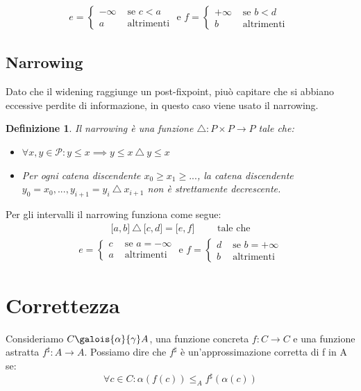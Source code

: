 \documentclass[a4paper, 11pt]{report}
\newtheorem{definit}{Definizione}[subsection]
\begin{document}
	\begin{align*}
	e = 
	\begin{cases}
	-\infty &\text{ se } c < a \\
	a &\text{ altrimenti}
	\end{cases}
	\text{ e } f = 
	\begin{cases}
	+\infty &\text{ se } b < d\\
	b &\text{ altrimenti }
	\end{cases}
	\end{align*}
	
	\subsection*{Narrowing}
	Dato che il widening raggiunge un post-fixpoint, piuò capitare che si abbiano eccessive perdite di informazione, in questo caso viene usato il narrowing.
	
	\begin{definit}
		Il narrowing è una funzione $ \triangle : P \times P \to P$ tale che:
		\begin{itemize}
			\item $\forall x, y \in \mathcal{P}: y \leq x \implies y \leq x\ \triangle\ y \leq x$
			\item Per ogni catena discendente $x_0 \geq x_1 \geq ...$, la catena discendente $y_0=x_0, ..., y_{i+1} = y_i\ \triangle\ x_{i+1}$ non è strettamente decrescente.
		\end{itemize}
	\end{definit}
	
	Per gli intervalli il narrowing funziona come segue:
	\begin{align*}
	\lbrack a, b \rbrack\ \triangle\ \lbrack c, d \rbrack = \lbrack e, f \rbrack \qquad \text{ tale che}
	\end{align*}
	\begin{align*}
	e = 
	\begin{cases}
	c &\text{ se } a = -\infty \\
	a &\text{ altrimenti}
	\end{cases}
	\text{ e } f = 
	\begin{cases}
	d &\text{ se } b = +\infty\\
	b &\text{ altrimenti }
	\end{cases}
	\end{align*}
	
	\section*{Correttezza}
	Consideriamo $C \galois{\alpha}{\gamma} A$, una funzione concreta $f: C\rightarrow C$ e una funzione astratta $f^{\sharp}: A\rightarrow A$. Possiamo dire che $f^{\sharp}$ è un'approssimazione corretta di f in A se:
	\begin{equation*}
	\forall c\in C: \alpha(f(c))\leq_A f^{\sharp}(\alpha(c))
	\end{equation*}
	
\end{document}
